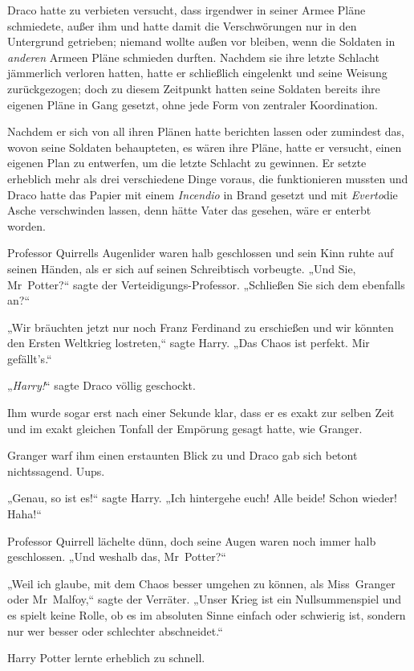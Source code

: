 {Draco hatte zu verbieten versucht, dass irgendwer in seiner Armee Pläne schmiedete, außer ihm und hatte damit die Verschwörungen nur in den Untergrund getrieben; niemand wollte außen vor bleiben, wenn die Soldaten in \emph{anderen} Armeen Pläne schmieden durften. Nachdem sie ihre letzte Schlacht jämmerlich verloren hatten, hatte er schließlich eingelenkt und seine Weisung zurückgezogen; doch zu diesem Zeitpunkt hatten seine Soldaten bereits ihre eigenen Pläne in Gang gesetzt, ohne jede Form von zentraler Koordination.

Nachdem er sich von all ihren Plänen hatte berichten lassen oder zumindest das, wovon seine Soldaten behaupteten, es wären ihre Pläne, hatte er versucht, einen eigenen Plan zu entwerfen, um die letzte Schlacht zu gewinnen. Er setzte erheblich mehr als drei verschiedene Dinge voraus, die funktionieren mussten und Draco hatte das Papier mit einem \emph{Incendio} in Brand gesetzt und mit \emph{Everto}die Asche verschwinden lassen, denn hätte Vater das gesehen, wäre er enterbt worden.

Professor Quirrells Augenlider waren halb geschlossen und sein Kinn ruhte auf seinen Händen, als er sich auf seinen Schreibtisch vorbeugte. „Und Sie, Mr~Potter?“ sagte der Verteidigungs-Professor. „Schließen Sie sich dem ebenfalls an?“

„Wir bräuchten jetzt nur noch Franz Ferdinand zu erschießen und wir könnten den Ersten Weltkrieg lostreten,“ sagte Harry. „Das Chaos ist perfekt. Mir gefällt's.“

„\emph{Harry!}“ sagte Draco völlig geschockt.

Ihm wurde sogar erst nach einer Sekunde klar, dass er es exakt zur selben Zeit und im exakt gleichen Tonfall der Empörung gesagt hatte, wie Granger.

Granger warf ihm einen erstaunten Blick zu und Draco gab sich betont nichtssagend. Uups.

„Genau, so ist es!“ sagte Harry. „Ich hintergehe euch! Alle beide! Schon wieder! Haha!“

Professor Quirrell lächelte dünn, doch seine Augen waren noch immer halb geschlossen. „Und weshalb das, Mr~Potter?“

„Weil ich glaube, mit dem Chaos besser umgehen zu können, als Miss~Granger oder Mr~Malfoy,“ sagte der Verräter. „Unser Krieg ist ein Nullsummenspiel und es spielt keine Rolle, ob es im absoluten Sinne einfach oder schwierig ist, sondern nur wer besser oder schlechter abschneidet.“

Harry Potter lernte erheblich zu schnell.

}
